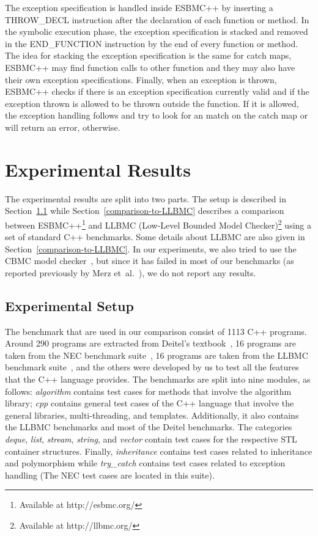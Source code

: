 \documentclass[a4paper]{llncs}
\begin{document}
The exception specification is handled inside ESBMC++
by inserting a THROW\_DECL instruction after the declaration
of each function or method. In the symbolic execution phase,
the exception specification is stacked and removed in the
END\_FUNCTION instruction by the end of every
function or method. The idea for stacking the exception
specification is the same for catch maps, ESBMC++ may
find function calls to other
function and they may also have their own exception specifications.
Finally, when an exception is thrown, ESBMC++ checks if there is an
exception specification currently valid and if the exception thrown
is allowed to be thrown outside the function. If it is allowed, the
exception handling follows and try to look for an match on the catch
map or will return an error, otherwise.


\section{Experimental Results}

The experimental results are split into two parts.
The setup is described in Section~\ref{experimental-setup}
while Section~\ref{comparison-to-LLBMC} describes a comparison
between ESBMC++\footnote{Available at http://esbmc.org/} and
LLBMC (Low-Level Bounded Model Checker)\footnote{Available at http://llbmc.org/}
using a set of standard C++ benchmarks. Some details about LLBMC
are also given in Section~\ref{comparison-to-LLBMC}.
In our experiments, we also tried to use the CBMC model checker~\cite{Clarke04},
but since it has failed in most of our benchmarks (as reported previously
by Merz et~al.~\cite{Florian12}), we do not report any results.

\subsection{Experimental Setup}
\label{experimental-setup}

The benchmark that are used in our comparison consist of 1113 C++ programs.
Around 290 programs are extracted from Deitel's textbook~\cite{Deitel},
16 programs are taken from the NEC benchmark suite~\cite{NeclabsBenchmarkExceptions},
16 programs are taken from the LLBMC benchmark suite~\cite{PrabhuMBIG11},
and the others were developed by us to test all the features that the C++ language
provides. The benchmarks are split into nine modules, as follows:
\textit{algorithm} contains test cases for methods that involve the
algorithm library; \textit{cpp} contains general test cases of the C++
language that involve the general libraries, multi-threading, and templates.
Additionally, it also contains the LLBMC benchmarks and most of the Deitel
benchmarks. The categories \textit{deque}, \textit{list},
\textit{stream}, \textit{string}, and \textit{vector} contain test cases
for the respective STL container structures.
Finally, \textit{inheritance} contains test cases related to inheritance and
polymorphism while \textit{try\_catch} contains test cases related to exception handling
(The NEC test cases are located in this suite).
\end{document}
